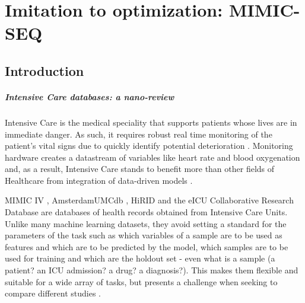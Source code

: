\chapter{Imitation to optimization: MIMIC-SEQ} \label{ch:mimicseq}


\section{Introduction}


\paragraph{Intensive Care databases: a nano-review}
\label{sec:datasets}

Intensive Care is the medical speciality that supports patients whose lives are in immediate danger.
As such, it requires robust real time monitoring of the patient's vital signs due to quickly identify potential deterioration \cite{Bailey2013trial, Blount2010Real, Bockholt2022Real, Dimitrios1999Distributed, Fried2000Some, Mao2012integrated, Prgomet2016Vital, Vincent2018Improving}.
Monitoring hardware creates a datastream of variables like heart rate and blood oxygenation and, as a result, Intensive Care stands to benefit more than other fields of Healthcare from integration of data-driven models \cite{nunezreizBigDataAnalysis2019}.

MIMIC IV \cite{johnsonMIMICIVFreelyAccessible2023}, AmsterdamUMCdb \cite{amsterdamumcdb-a}, HiRID \cite{yecheHiRIDICUBenchmarkComprehensiveMachine} and the eICU Collaborative Research Database \cite{pollard2018a} are databases of health records obtained from Intensive Care Units.
Unlike many machine learning datasets, they avoid setting a standard for the parameters of the task such as which variables of a sample are to be used as features and which are to be predicted by the model, which samples are to be used for training and which are the holdout set - even what is a sample (a patient? an ICU admission? a drug? a diagnosis?). This makes them flexible and suitable for a wide array of tasks, but presents a challenge when seeking to compare different studies \cite{mcdermottReproducibilityMachineLearning2021}.

